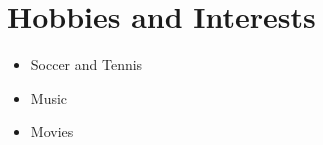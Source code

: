 \section{Hobbies and Interests}
\begin{itemize}
  \item Soccer and Tennis
  \item Music
  \item Movies
\end{itemize}
